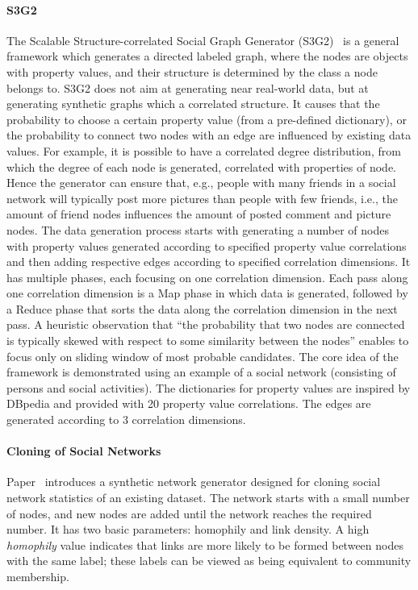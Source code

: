 \paragraph{S3G2} The Scalable Structure-correlated Social Graph Generator
(S3G2)~\cite{Pham2013} is a general framework which  generates a directed
labeled graph, where the nodes are objects with property values, and their
structure is determined by the class a node belongs to. S3G2 does not aim at
generating near real-world data, but at generating synthetic graphs which a
correlated structure. It causes that the probability to choose a certain
property value (from a pre-defined dictionary), or the probability to connect
two nodes with an edge are influenced by existing data values. For example, it
is possible to have a correlated degree distribution, from which the degree of
each node is generated, correlated with properties of node. Hence the generator
can ensure that, e.g., people with many friends in a social network will
typically post more pictures than people with few friends, i.e., the amount of
friend nodes influences the amount of posted comment and picture nodes. The data generation process starts with generating a number of nodes with
property values generated according to specified property value correlations and
then adding respective edges according to specified correlation dimensions. It
has multiple phases, each focusing on one correlation dimension. Each pass along
one correlation dimension is a Map phase in which data is generated, followed by
a Reduce phase that sorts the data along the correlation dimension in the next
pass. A heuristic observation that ``the probability that two nodes are
connected is typically skewed with respect to some similarity between the
nodes'' enables to focus only on sliding window of most probable candidates. The core idea of the framework is demonstrated using an example of a social
network (consisting of persons and social activities).  The dictionaries for
property values are inspired by DBpedia and provided with 20 property value
correlations. The edges are generated according to 3 correlation dimensions.


\paragraph{Cloning of Social Networks} Paper~\cite{Sukthankar-SocialInfo2014}
introduces a synthetic network generator designed for cloning social network
statistics of an existing dataset. The network starts with a small number of
nodes, and new nodes are added until the network reaches the required number. It
has two basic parameters: homophily and link density. A high \emph{homophily}
value indicates that links are more likely to be formed between nodes with the
same label; these labels can be viewed as being equivalent to community
membership.

